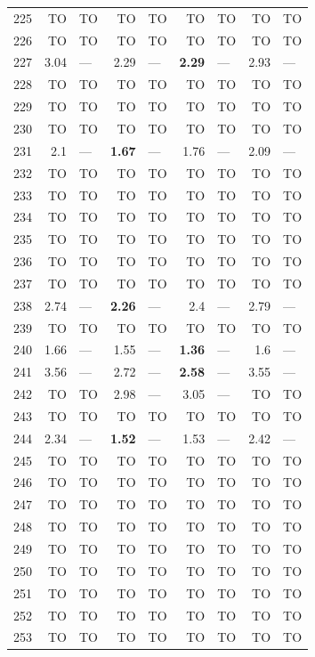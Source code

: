\begin{longtable}{lr@{\hskip 4pt}l@{\hskip 12pt}r@{\hskip 4pt}l@{\hskip 12pt}r@{\hskip 4pt}l@{\hskip 12pt}r@{\hskip 4pt}l@{\hskip 12pt}}
225 & TO & TO & TO & TO & TO & TO & TO & TO \\
226 & TO & TO & TO & TO & TO & TO & TO & TO \\
227 & 3.04 & --- & 2.29 & --- & \textbf{2.29} & --- & 2.93 & --- \\
228 & TO & TO & TO & TO & TO & TO & TO & TO \\
229 & TO & TO & TO & TO & TO & TO & TO & TO \\
230 & TO & TO & TO & TO & TO & TO & TO & TO \\
231 & 2.1 & --- & \textbf{1.67} & --- & 1.76 & --- & 2.09 & --- \\
232 & TO & TO & TO & TO & TO & TO & TO & TO \\
233 & TO & TO & TO & TO & TO & TO & TO & TO \\
234 & TO & TO & TO & TO & TO & TO & TO & TO \\
235 & TO & TO & TO & TO & TO & TO & TO & TO \\
236 & TO & TO & TO & TO & TO & TO & TO & TO \\
237 & TO & TO & TO & TO & TO & TO & TO & TO \\
238 & 2.74 & --- & \textbf{2.26} & --- & 2.4 & --- & 2.79 & --- \\
239 & TO & TO & TO & TO & TO & TO & TO & TO \\
240 & 1.66 & --- & 1.55 & --- & \textbf{1.36} & --- & 1.6 & --- \\
241 & 3.56 & --- & 2.72 & --- & \textbf{2.58} & --- & 3.55 & --- \\
242 & TO & TO & 2.98 & --- & 3.05 & --- & TO & TO \\
243 & TO & TO & TO & TO & TO & TO & TO & TO \\
244 & 2.34 & --- & \textbf{1.52} & --- & 1.53 & --- & 2.42 & --- \\
245 & TO & TO & TO & TO & TO & TO & TO & TO \\
246 & TO & TO & TO & TO & TO & TO & TO & TO \\
247 & TO & TO & TO & TO & TO & TO & TO & TO \\
248 & TO & TO & TO & TO & TO & TO & TO & TO \\
249 & TO & TO & TO & TO & TO & TO & TO & TO \\
250 & TO & TO & TO & TO & TO & TO & TO & TO \\
251 & TO & TO & TO & TO & TO & TO & TO & TO \\
252 & TO & TO & TO & TO & TO & TO & TO & TO \\
253 & TO & TO & TO & TO & TO & TO & TO & TO \\

\end{longtable}
